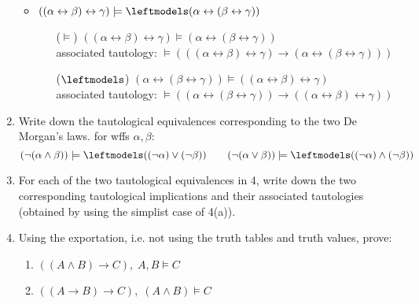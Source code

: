 \documentclass[11pt]{article}
\newcommand{\n}{\vspace{0.5cm}}
\begin{document}
\begin{enumerate}
\begin{itemize}
        \item \(((\alpha \leftrightarrow \beta) \leftrightarrow \gamma) \models \leftmodels (\alpha \leftrightarrow (\beta \leftrightarrow \gamma))\)
          \begin{enumerate}
            \item[(\(\models\))] \(((\alpha \leftrightarrow \beta) \leftrightarrow \gamma) \models (\alpha \leftrightarrow (\beta \leftrightarrow \gamma))\)\\ associated tautology: \(\models (((\alpha \leftrightarrow \beta) \leftrightarrow \gamma) \to (\alpha \leftrightarrow (\beta \leftrightarrow \gamma)))\)
            \item[(\(\leftmodels\))] \((\alpha \leftrightarrow (\beta \leftrightarrow \gamma)) \models ((\alpha \leftrightarrow \beta) \leftrightarrow \gamma)\)\\ associated tautology: \(\models ((\alpha \leftrightarrow (\beta \leftrightarrow \gamma)) \to ((\alpha \leftrightarrow \beta) \leftrightarrow \gamma))\)
          \end{enumerate}
      \end{itemize} \n

    \item Write down the tautological equivalences corresponding to the two De Morgan's laws.
      for wffs \(\alpha, \beta\):
      \[(\neg (\alpha \wedge \beta)) \models \leftmodels ((\neg \alpha) \vee (\neg \beta)) \quad \quad (\neg (\alpha \vee \beta)) \models \leftmodels ((\neg \alpha) \wedge (\neg \beta))\]

    \item For each of the two tautological equivalences in 4, write down the two corresponding tautological implications and their associated tautologies (obtained by using the simplist case of 4(a)).

    \item Using the exportation, i.e. not using the truth tables and truth values, prove:
      \begin{enumerate}
        \item \(((A \wedge B) \to C), \; A,B \vDash C\)
        \item \(((A \to B) \to C), \; (A \wedge B) \vDash C\)
      \end{enumerate}
  \end{enumerate}
\end{document}
